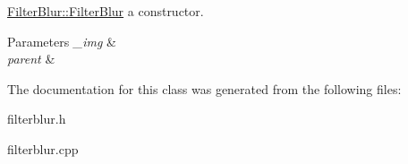 \mbox{\hyperlink{class_filter_blur_a060cd0551ff0d3056cbabb050dcf2640}{Filter\+Blur\+::\+Filter\+Blur}} a constructor. 


\begin{DoxyParams}{Parameters}
{\em \+\_\+img} & \\
\hline
{\em parent} & \\
\hline
\end{DoxyParams}


The documentation for this class was generated from the following files\+:\begin{DoxyCompactItemize}
\item 
filterblur.\+h\item 
filterblur.\+cpp\end{DoxyCompactItemize}
